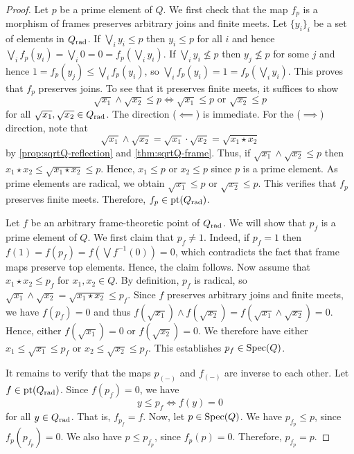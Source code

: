 \documentclass[10pt,a4paper,oneside]{article}
\begin{document}
\begin{proof}
Let $p$ be a prime element of $Q$. We first check that the map $f_p$ is a morphism of frames \ie preserves arbitrary joins and finite meets. Let $\{y_i\}_i$ be a set of elements in $Q_{\operatorname{rad}}$. If $\bigvee_{i}y_i \le p$ then $y_i \le p$ for all $i$ and hence $\bigvee_if_p(y_i) = \bigvee_i0 = 0 = f_p(\bigvee_iy_i)$. If $\bigvee_{i}y_i \not\le p$ then $y_j \not\le p$ for some $j$ and hence $1 = f_p(y_j) \le \bigvee_if_p(y_i)$, so $\bigvee_if_p(y_i) = 1 = f_p(\bigvee_iy_i)$. This proves that $f_p$ preserves joins. To see that it preserves finite meets, it suffices to show
\[
\sqrt{x_1} \wedge \sqrt{x_2} \le p \iff \sqrt{x_1} \le p \text{ or } \sqrt{x_2} \le p
\]
for all $\sqrt{x_1}, \sqrt{x_2} \in Q_{\operatorname{rad}}$. The direction ($\impliedby$) is immediate. For the ($\implies$) direction, note that
\[
\sqrt{x_1} \wedge \sqrt{x_2} = \sqrt{x_1}\cdot\sqrt{x_2} = \sqrt{x_1\star x_2}
\]
by \cref{prop:sqrtQ-reflection} and \cref{thm:sqrtQ-frame}.
Thus, if $\sqrt{x_1} \wedge \sqrt{x_2} \le p$ then $x_1\star x_2 \leq \sqrt{x_1\star x_2} \le p$. Hence, $x_1\le p$ or $x_2\le p$ since $p$ is a prime element. As prime elements are radical, we obtain $\sqrt{x_1} \le p$ or $\sqrt{x_2} \le p$. This verifies that $f_p$ preserves finite meets. Therefore, $f_p \in \operatorname{pt}(Q_{\operatorname{rad}})$.

Let $f$ be an arbitrary frame-theoretic point of $Q_{\operatorname{rad}}$. We will show that $p_f$ is a prime element of $Q$. We first claim that $p_f\neq1$. Indeed, if $p_f=1$ then $f(1)=f(p_f)=f(\bigvee f^{-1}(0))=0$, which contradicts the fact that frame maps preserve top elements. Hence, the claim follows. Now assume that $x_1 \star x_2 \le p_f$ for $x_1, x_2 \in Q$. By definition, $p_f$ is radical, so $\sqrt{x_1} \wedge \sqrt{x_2} = \sqrt{x_1 \star x_2} \le p_f$. Since $f$ preserves arbitrary joins and finite meets, we have $f(p_f)=0$ and thus $f(\sqrt{x_1})\wedge f(\sqrt{x_2}) = f(\sqrt{x_1}\wedge \sqrt{x_2}) = 0$. Hence, either $f(\sqrt{x_1})=0$ or $f(\sqrt{x_2})=0$. We therefore have either $x_1 \le \sqrt{x_1} \le p_f$ or $x_2 \le \sqrt{x_2} \le p_f$. This establishes $p_f\in \operatorname{Spec}(Q)$.

It remains to verify that the maps $p_{(-)}$ and $f_{(-)}$ are inverse to each other. Let $f \in \operatorname{pt}(Q_{\operatorname{rad}})$. Since $f(p_f)=0$, we have
\[
y \le p_f \iff f(y)=0
\]
for all $y\in Q_{\operatorname{rad}}$. That is, $f_{p_{f}}=f$. Now, let $p\in\operatorname{Spec}(Q)$. We have $p_{f_p} \le p$, since $f_p(p_{f_p})=0$. We also have $p\le p_{f_p}$, since $f_p(p)=0$. Therefore, $p_{f_p} = p$.
\end{proof}
\end{document}
